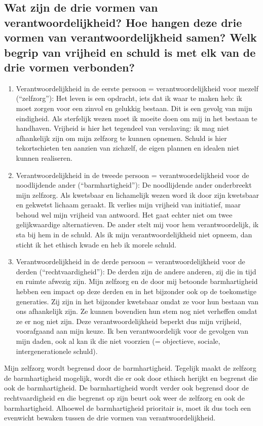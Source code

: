 \documentclass[11pt,a4paper,titlepage]{article}
\begin{document}
\subsection{Wat zijn de drie vormen van verantwoordelijkheid? Hoe hangen deze drie vormen van verantwoordelijkheid samen? Welk begrip van vrijheid en schuld is met elk van de drie vormen verbonden? }
\begin{enumerate}
\item Verantwoordelijkheid in de eerste persoon = verantwoordelijkheid voor mezelf (“zelfzorg”): Het leven is een opdracht, iets dat ik waar te maken heb: ik moet zorgen voor een zinvol en gelukkig bestaan. Dit is een gevolg van mijn eindigheid. Als sterfelijk wezen moet ik moeite doen om mij in het bestaan te handhaven. Vrijheid is hier het tegendeel van verslaving: ik mag niet afhankelijk zijn om mijn zelfzorg te kunnen opnemen. Schuld is hier tekortschieten ten aanzien van zichzelf, de eigen plannen en idealen niet kunnen realiseren.
\item Verantwoordelijkheid in de tweede persoon = verantwoordelijkheid voor de noodlijdende ander (“barmhartigheid”): De noodlijdende ander
onderbreekt mijn zelfzorg. Als kwetsbaar en lichamelijk wezen word ik door zijn kwetsbaar en gekwetst lichaam geraakt. Ik verlies mijn vrijheid van initiatief, maar behoud wel mijn vrijheid van antwoord. Het gaat echter niet om twee gelijkwaardige alternatieven. De ander stelt mij voor hem verantwoordelijk, ik sta bij hem in de schuld. Als ik mijn verantwoordelijkheid niet opneem, dan sticht ik het ethisch kwade en heb ik morele schuld.
\item Verantwoordelijkheid in de derde persoon = verantwoordelijkheid voor de derden (“rechtvaardigheid”): De derden zijn de andere anderen, zij die in tijd en ruimte afwezig zijn. Mijn zelfzorg en de door mij betoonde barmhartigheid hebben een impact op deze derden en in het bijzonder ook op de toekomstige
generaties. Zij zijn in het bijzonder kwetsbaar omdat ze voor hun bestaan van ons afhankelijk zijn. Ze kunnen bovendien hun stem nog niet verheffen omdat ze er nog niet zijn. Deze verantwoordelijkheid beperkt dus mijn vrijheid, voorafgaand aan mijn keuze. Ik ben verantwoordelijk voor de gevolgen van mijn daden, ook al kan ik die niet voorzien (= objectieve, sociale, intergenerationele schuld).
\end{enumerate}Mijn zelfzorg wordt begrensd door de barmhartigheid. Tegelijk maakt de zelfzorg de barmhartigheid mogelijk, wordt die er ook door ethisch
herijkt en begrenst die ook de barmhartigheid. De barmhartigheid wordt verder ook begrensd door de rechtvaardigheid en die begrenst op zijn beurt ook weer de zelfzorg en ook de barmhartigheid. Alhoewel de barmhartigheid prioritair is, moet ik dus toch een evenwicht bewaken tussen de drie vormen van verantwoordelijkheid.
\end{document}
